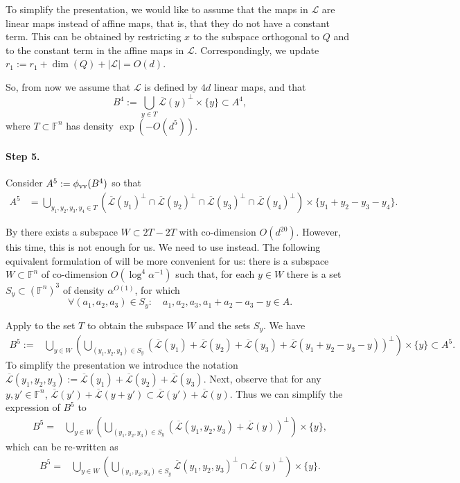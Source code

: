 \documentclass[12pt]{article}
\newcommand{\F}{\mathbb{F}}
\newcommand{\vr}{\textup{v}}
\newcommand{\LL}{\mathcal{L}}
\begin{document}
To simplify the presentation, we would like to assume that the maps in $\LL$ are linear maps instead of affine maps,
that is, that they do not have a constant term. This can be obtained by restricting $x$ to the subspace orthogonal
to $Q$ and to the constant term in the affine maps in $\LL$. Correspondingly, we update
$r_1 := r_1 + \dim(Q)+|\LL| = O(d)$.

So, from now we assume that $\LL$ is defined by $4d$ linear maps, and that
$$
B^4 := \bigcup_{y\in T} {\overline{\LL}(y)}^\perp \times \{y\} \subset A^4,
$$
where $T \subset \F^n$ has density $\exp(-O(d^5))$.

\paragraph{Step 5.}
Consider $A^5 := \phi_{\vr\vr}(B^4)$ so that
\begin{align*}
	A^5 & =\bigcup_{y_1,y_2,y_3,y_4 \in T} \left( {\overline{\LL}(y_1)}^\perp \cap{\overline{\LL}(y_2)}^\perp \cap {\overline{\LL}(y_3)}^\perp \cap {\overline{\LL}(y_4)}^\perp \right) \times \{y_1+y_2-y_3-y_4\}.
\end{align*}



 By   there exists a subspace $W\subset 2T-2T$ with co-dimension $O(d^{20})$.
However, this time, this is not enough for us. We need to use  instead.
The following equivalent formulation of  will be more convenient for us: there is a subspace $W \subset \F^n$ of co-dimension $O(\log^4{\alpha^{-1}})$ such that, for each $y \in W$ there is
a set $S_y\subset (\F^n)^3$ of density $\alpha^{O(1)}$, for which
$$
\forall (a_1,a_2,a_3)\in S_y: \quad a_1,a_2,a_3,a_1+a_2-a_3-y \in A.
$$

Apply  to the set $T$ to obtain the subspace $W$ and the sets $S_y$. We have
\begin{align*}
	B^5 :=& \bigcup_{y\in W}\left( \bigcup_{(y_1,y_2,y_3)\in S_y} \left(\overline{\LL}(y_1)+ \overline{\LL}(y_2)+ \overline{\LL}(y_3) + \overline{\LL}(y_1+y_2-y_3-y)\right)^\perp  \right) \times \{y\} \subset A^5.
\end{align*}
To simplify the presentation we introduce the notation $\overline{\LL}(y_1,y_2,y_3) := \overline{\LL}(y_1)+ \overline{\LL}(y_2)+ \overline{\LL}(y_3)$.
Next, observe that for any $y,y'\in \F^n$, $\overline{\LL}(y')+\overline{\LL}(y+y')\subset \overline{\LL}(y')+\overline{\LL}(y)$.
Thus we can simplify the expression of $B^5$ to
\begin{align*}
	B^5 =& \bigcup_{y\in W}\left( \bigcup_{(y_1,y_2,y_3)\in S_y} \left(\overline{\LL}(y_1,y_2,y_3) + \overline{\LL}(y) \right)^\perp \right) \times \{y\},
\end{align*}
which can be re-written as
\begin{align*}
	B^5 =& \bigcup_{y\in W}\left( \bigcup_{(y_1,y_2,y_3)\in S_y} \overline{\LL}(y_1,y_2,y_3) ^\perp \cap  {\overline{\LL}(y)}^\perp \right) \times \{y\}.
\end{align*}
\end{document}
